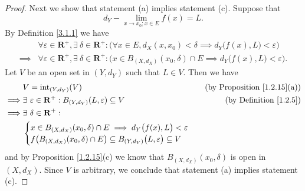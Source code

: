 \begin{proof}
    Next we show that statement (a) implies statement (c).
    Suppose that
    \[
        d_Y - \lim_{x \to x_0 ; x \in E} f(x) = L.
    \]
    By Definition \ref{3.1.1} we have
    \begin{align*}
                 & \forall \varepsilon \in \mathbf{R}^+, \exists\ \delta \in \mathbf{R}^+ : \Big(\forall x \in E, d_X(x, x_0) < \delta \implies d_Y\big(f(x), L\big) < \varepsilon\Big)   \\
        \implies & \forall \varepsilon \in \mathbf{R}^+, \exists\ \delta \in \mathbf{R}^+ : \Big(x \in B_{(X, d_X)}(x_0, \delta) \cap E \implies d_Y\big(f(x), L\big) < \varepsilon\Big).
    \end{align*}
    Let \(V\) be an open set in \((Y, d_Y)\) such that \(L \in V\).
    Then we have
    \begin{align*}
                 & V = \text{int}_{(Y, d_Y)}(V)                                                                           & \text{(by Proposition \ref{1.2.15}(a))} \\
        \implies & \exists\ \varepsilon \in \mathbf{R}^+ : B_{(Y, d_Y)}(L, \varepsilon) \subseteq V                       & \text{(by Definition \ref{1.2.5})}      \\
        \implies & \exists\ \delta \in \mathbf{R}^+ :                                                                                                               \\
                 & \begin{cases}
                       x \in B_{(X, d_X)}(x_0, \delta) \cap E \implies d_Y\big(f(x), L\big) < \varepsilon \\
                       f\big(B_{(X, d_X)}(x_0, \delta) \cap E\big) \subseteq B_{(Y, d_Y)}\big(L, \varepsilon\big) \subseteq V
                   \end{cases}
    \end{align*}
    and by Proposition \ref{1.2.15}(c) we know that \(B_{(X, d_X)}(x_0, \delta)\) is open in \((X, d_X)\).
    Since \(V\) is arbitrary, we conclude that statement (a) implies statement (c).


\end{proof}
